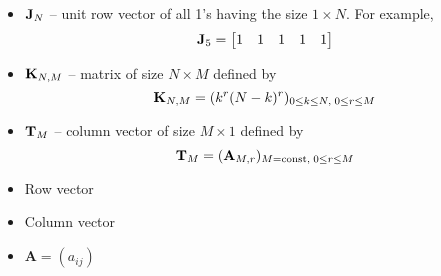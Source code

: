 ﻿\begin{itemize}
    \item ${\mathbf{J}} \sb{N}$ -- unit row vector of all 1's having the size $1 \times N$.
    For example,
    \[
        {\mathbf{J}} \sb{5} =
        \begin{bmatrix}
            1 & 1 & 1 & 1 & 1
        \end{bmatrix}
    \]
    \item ${\mathbf{K}} \sb{N, M}$ -- matrix of size $N \times M$ defined by
    \[
        {\mathbf{K}} \sb{N, M} = (k^r (N-k)^r)_{0 \leq k \leq N, \; 0 \leq r \leq M}
    \]
    \item ${\mathbf{T}} \sb{M}$ -- column vector of size $M \times 1$ defined by
    \[
        {\mathbf{T}} \sb{M} = ({\mathbf{A}} \sb{M,r})_{M=\mathrm{const}, \; 0 \leq r \leq M}
    \]
    \item Row vector
    \item Column vector
    \item $\mathbf{A} = (a_{ij})$
\end{itemize}
